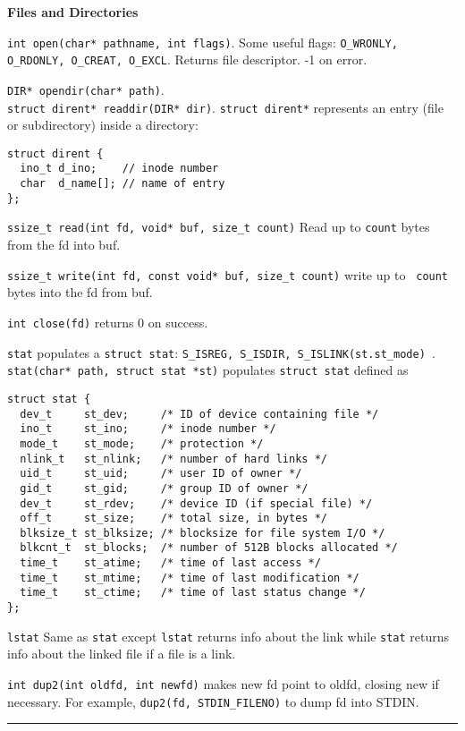 \documentclass{article}
\begin{document}
\scriptsize
\begin{multicols}{3}
  \raggedright
  {\bf Files and Directories}

  {\tt int open(char* pathname, int flags)}. Some useful flags:
  {\tt O\_WRONLY, O\_RDONLY, O\_CREAT, O\_EXCL}. Returns file descriptor. -1 on
  error.

  {\tt DIR* opendir(char* path)}.\\
  {\tt struct dirent* readdir(DIR* dir)}. \texttt{struct dirent*} represents an
  entry (file or subdirectory) inside a directory:
  \begin{verbatim}
struct dirent {
  ino_t d_ino;    // inode number
  char  d_name[]; // name of entry
};\end{verbatim}
  {\tt ssize\_t read(int fd, void* buf, size\_t count)} Read up to {\tt count}
  bytes from the fd into buf.

  {\tt ssize\_t write(int fd, const void* buf, size\_t count)} write up to {\tt
  count} bytes into the fd from buf.

  {\tt int close(fd)} returns 0 on success.

  {\tt stat} populates a {\tt struct stat}:
  {\tt S\_ISREG, S\_ISDIR, S\_ISLINK(st.st\_mode) }.
  {\tt stat(char* path, struct stat *st)} populates \texttt{struct stat} defined
  as
{\tiny
  \begin{verbatim}
struct stat {
  dev_t     st_dev;     /* ID of device containing file */
  ino_t     st_ino;     /* inode number */
  mode_t    st_mode;    /* protection */
  nlink_t   st_nlink;   /* number of hard links */
  uid_t     st_uid;     /* user ID of owner */
  gid_t     st_gid;     /* group ID of owner */
  dev_t     st_rdev;    /* device ID (if special file) */
  off_t     st_size;    /* total size, in bytes */
  blksize_t st_blksize; /* blocksize for file system I/O */
  blkcnt_t  st_blocks;  /* number of 512B blocks allocated */
  time_t    st_atime;   /* time of last access */
  time_t    st_mtime;   /* time of last modification */
  time_t    st_ctime;   /* time of last status change */
}; \end{verbatim}
}
  {\tt lstat} Same as {\tt stat} except {\tt lstat} returns info about the
  link while {\tt stat} returns info about the linked file if a file is a link.

  {\tt int dup2(int oldfd, int newfd)} makes new fd point to oldfd, closing new
  if necessary. For example, {\tt dup2(fd, STDIN\_FILENO)} to dump fd into STDIN.

  \noindent\rule{4cm}{0.4pt}


\end{multicols}
\end{document}
